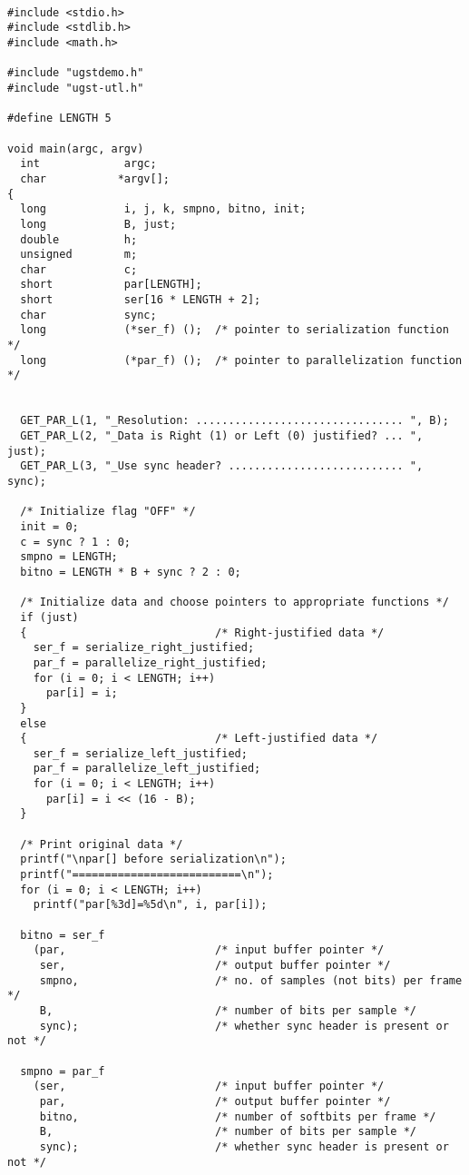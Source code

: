 {\tt\small
\begin{verbatim}
#include <stdio.h>
#include <stdlib.h>
#include <math.h>

#include "ugstdemo.h"
#include "ugst-utl.h"

#define LENGTH 5

void main(argc, argv)
  int             argc;
  char           *argv[];
{
  long            i, j, k, smpno, bitno, init;
  long            B, just;
  double          h;
  unsigned        m;
  char            c;
  short           par[LENGTH];
  short           ser[16 * LENGTH + 2];
  char            sync;
  long            (*ser_f) ();  /* pointer to serialization function */
  long            (*par_f) ();  /* pointer to parallelization function */


  GET_PAR_L(1, "_Resolution: ................................ ", B);
  GET_PAR_L(2, "_Data is Right (1) or Left (0) justified? ... ", just);
  GET_PAR_L(3, "_Use sync header? ........................... ", sync);

  /* Initialize flag "OFF" */
  init = 0;
  c = sync ? 1 : 0;
  smpno = LENGTH;
  bitno = LENGTH * B + sync ? 2 : 0;

  /* Initialize data and choose pointers to appropriate functions */
  if (just)
  {                             /* Right-justified data */
    ser_f = serialize_right_justified;
    par_f = parallelize_right_justified;
    for (i = 0; i < LENGTH; i++)
      par[i] = i;
  }
  else
  {                             /* Left-justified data */
    ser_f = serialize_left_justified;
    par_f = parallelize_left_justified;
    for (i = 0; i < LENGTH; i++)
      par[i] = i << (16 - B);
  }

  /* Print original data */
  printf("\npar[] before serialization\n");
  printf("==========================\n");
  for (i = 0; i < LENGTH; i++)
    printf("par[%3d]=%5d\n", i, par[i]);

  bitno = ser_f
    (par,                       /* input buffer pointer */
     ser,                       /* output buffer pointer */
     smpno,                     /* no. of samples (not bits) per frame */
     B,                         /* number of bits per sample */
     sync);                     /* whether sync header is present or not */

  smpno = par_f
    (ser,                       /* input buffer pointer */
     par,                       /* output buffer pointer */
     bitno,                     /* number of softbits per frame */
     B,                         /* number of bits per sample */
     sync);                     /* whether sync header is present or not */



\end{verbatim}}
